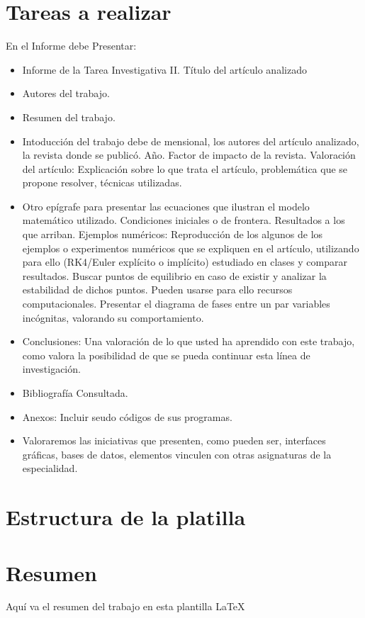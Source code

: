 \section*{Tareas a realizar}
En el Informe debe Presentar:
\begin{itemize}
 \item Informe de la Tarea Investigativa II. T\'itulo del art\'iculo analizado
 \item Autores del trabajo.
 \item Resumen del trabajo.
 \item Intoducci\'on del trabajo debe de mensional, los autores del art\'iculo analizado, la revista donde se public\'o. A\~no. Factor de impacto de la revista. Valoraci\'on del art\'iculo: Explicaci\'on sobre lo que trata el art\'iculo, problem\'atica que se propone resolver, t\'ecnicas utilizadas.
 \item Otro ep\'igrafe para presentar las ecuaciones que ilustran el modelo matem\'atico utilizado. Condiciones iniciales o de frontera. Resultados a los que arriban. Ejemplos num\'ericos: Reproducci\'on de los algunos de los ejemplos o experimentos num\'ericos que se expliquen en el art\'iculo, utilizando para ello (RK4/Euler expl\'icito o impl\'icito) estudiado en clases y comparar resultados. Buscar puntos de equilibrio en caso de existir y analizar la estabilidad de dichos puntos. Pueden usarse para ello recursos computacionales. Presentar el diagrama de fases entre un par variables inc\'ognitas, valorando su comportamiento.
 \item Conclusiones: Una valoraci\'on de lo que usted ha aprendido con este trabajo, como valora la posibilidad de que se pueda continuar esta l\'inea de investigaci\'on.
 \item Bibliograf\'ia Consultada.
 \item  Anexos: Incluir seudo c\'odigos de sus programas.
 \item Valoraremos las iniciativas que presenten, como pueden ser, interfaces gr\'aficas, bases de datos, elementos  vinculen con otras asignaturas de la especialidad.
\end{itemize}

\section*{Estructura de la platilla}
\section*{Resumen}
Aqu\'i va el resumen del trabajo en esta plantilla  \LaTeX\ 

